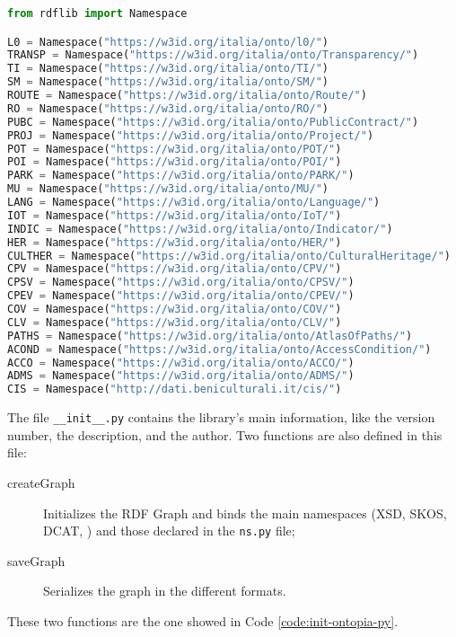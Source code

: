 \begin{lstlisting}[language=python,caption={Part of the ns.py file that contains the namespaces of OntoPiA's ontologies.},label=code:namespaces-py]
from rdflib import Namespace

L0 = Namespace("https://w3id.org/italia/onto/l0/")
TRANSP = Namespace("https://w3id.org/italia/onto/Transparency/")
TI = Namespace("https://w3id.org/italia/onto/TI/")
SM = Namespace("https://w3id.org/italia/onto/SM/")
ROUTE = Namespace("https://w3id.org/italia/onto/Route/")
RO = Namespace("https://w3id.org/italia/onto/RO/")
PUBC = Namespace("https://w3id.org/italia/onto/PublicContract/")
PROJ = Namespace("https://w3id.org/italia/onto/Project/")
POT = Namespace("https://w3id.org/italia/onto/POT/")
POI = Namespace("https://w3id.org/italia/onto/POI/")
PARK = Namespace("https://w3id.org/italia/onto/PARK/")
MU = Namespace("https://w3id.org/italia/onto/MU/")
LANG = Namespace("https://w3id.org/italia/onto/Language/")
IOT = Namespace("https://w3id.org/italia/onto/IoT/")
INDIC = Namespace("https://w3id.org/italia/onto/Indicator/")
HER = Namespace("https://w3id.org/italia/onto/HER/")
CULTHER = Namespace("https://w3id.org/italia/onto/CulturalHeritage/")
CPV = Namespace("https://w3id.org/italia/onto/CPV/")
CPSV = Namespace("https://w3id.org/italia/onto/CPSV/")
CPEV = Namespace("https://w3id.org/italia/onto/CPEV/")
COV = Namespace("https://w3id.org/italia/onto/COV/")
CLV = Namespace("https://w3id.org/italia/onto/CLV/")
PATHS = Namespace("https://w3id.org/italia/onto/AtlasOfPaths/")
ACOND = Namespace("https://w3id.org/italia/onto/AccessCondition/")
ACCO = Namespace("https://w3id.org/italia/onto/ACCO/")
ADMS = Namespace("https://w3id.org/italia/onto/ADMS/")
CIS = Namespace("http://dati.beniculturali.it/cis/")
\end{lstlisting}

The file \verb#__init__.py# contains the library's main information, like the version number, the description, and the author. Two functions are also defined in this file:

\begin{description}
  \item[createGraph] Initializes the \ac{RDF} Graph and binds the main namespaces (XSD, SKOS, DCAT, \etc) and those declared in the \verb#ns.py# file;
  \item[saveGraph] Serializes the graph in the different formats.
\end{description}

These two functions are the one showed in Code \ref{code:init-ontopia-py}.

